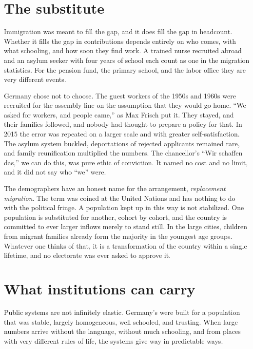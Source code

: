 \documentclass[12pt,a4paper]{book}
\begin{document}
\section{The substitute}

Immigration was meant to fill the gap, and it does fill the gap in headcount. Whether it fills the gap in contributions depends entirely on who comes, with what schooling, and how soon they find work. A trained nurse recruited abroad and an asylum seeker with four years of school each count as one in the migration statistics. For the pension fund, the primary school, and the labor office they are very different events.

Germany chose not to choose. The guest workers of the 1950s and 1960s were recruited for the assembly line on the assumption that they would go home. ``We asked for workers, and people came,'' as Max Frisch put it. They stayed, and their families followed, and nobody had thought to prepare a policy for that. In 2015 the error was repeated on a larger scale and with greater self-satisfaction. The asylum system buckled, deportations of rejected applicants remained rare, and family reunification multiplied the numbers. The chancellor's ``Wir schaffen das,'' we can do this, was pure ethic of conviction. It named no cost and no limit, and it did not say who ``we'' were.

The demographers have an honest name for the arrangement, \emph{replacement migration}. The term was coined at the United Nations and has nothing to do with the political fringe. A population kept up in this way is not stabilized. One population is substituted for another, cohort by cohort, and the country is committed to ever larger inflows merely to stand still. In the large cities, children from migrant families already form the majority in the youngest age groups. Whatever one thinks of that, it is a transformation of the country within a single lifetime, and no electorate was ever asked to approve it.

\section{What institutions can carry}

Public systems are not infinitely elastic. Germany's were built for a population that was stable, largely homogeneous, well schooled, and trusting. When large numbers arrive without the language, without much schooling, and from places with very different rules of life, the systems give way in predictable ways.
\end{document}
